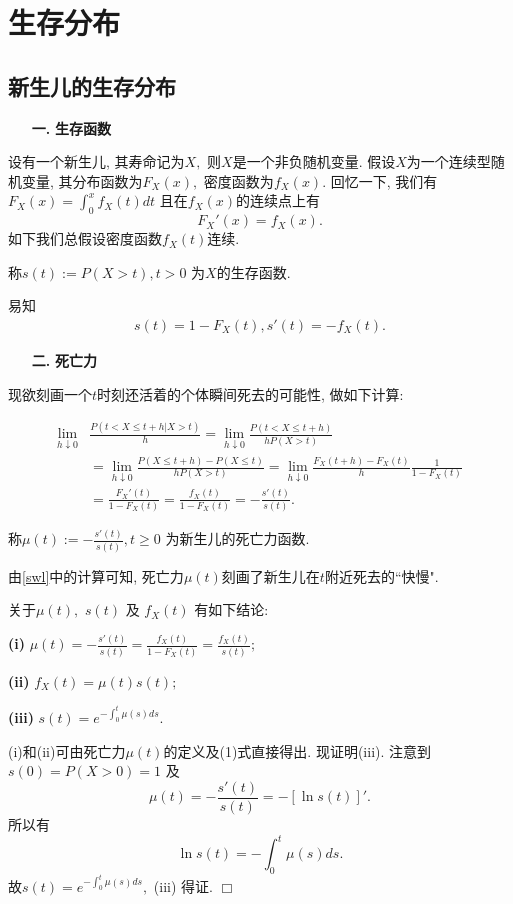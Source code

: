 \documentclass[a4paper,10pt]{ctexbook}
\newcommand{\hei}{\CJKfamily{hei}}      %
\def\qed{\hfill$\Box$\medskip}
\def\no{\nonumber}
\begin{document}
\mainmatter
\chapter{生存分布}
\section{新生儿的生存分布}
\begin{itemize}
    \item[{\bf\hei 一.}]{\bf\hei 生存函数}
\end{itemize}

设有一个新生儿, 其寿命记为$X,$ 则$X$是一个非负随机变量. 假设$X$为一个连续型随机变量, 其分布函数为$F_X(x),$ 密度函数为$f_X(x).$ 回忆一下, 我们有 $F_X(x)=\int_0^x f_X(t)dt$ 且在$f_X(x)$的连续点上有
$$F_X'(x)=f_X(x).$$
如下我们总假设密度函数$f_X(t)$连续.
\begin{definition}
    称$s(t):=P(X>t),t>0$ 为$X$的生存函数.
\end{definition}
易知
\begin{align}\label{sf}
    s(t)=1-F_X(t), s'(t)=-f_X(t).
\end{align}

\begin{itemize}
    \item[{\bf\hei  二.}]{\bf\hei 死亡力}
\end{itemize}

现欲刻画一个$t$时刻还活着的个体瞬间死去的可能性, 做如下计算:

\begin{align}\label{swl}
    \lim_{h\downarrow0} & \frac{P(t<X\le t+h|X>t)}{h}=\lim_{h\downarrow0} \frac{P(t<X\le t+h)}{hP(X>t)}\no                                            \\
                        & =\lim_{h\downarrow0}\frac{P(X\le t+h)-P(X\le t)}{hP(X>t)}=\lim_{h\downarrow0}\frac{F_X(t+h)-F_X(t)}{h}\frac{1}{1-F_X(t)}\no \\
                        & =\frac{F_X'(t)}{1-F_X(t)}=\frac{f_X(t)}{1-F_X(t)}=-\frac{s'(t)}{s(t)}.
\end{align}

\begin{definition}
    称$\mu(t):=-\frac{s'(t)}{s(t)},t\ge 0$ 为新生儿的死亡力函数.
\end{definition}
由\eqref{swl}中的计算可知, 死亡力$\mu(t)$刻画了新生儿在$t$附近死去的``快慢".

\begin{proposition} 关于$\mu(t),$ $s(t)$ 及 $f_X(t)$ 有如下结论:

    {\rm\bf(i)} $\mu(t)=-\frac{s'(t)}{s(t)}=\frac{f_X(t)}{1-F_X(t)}=\frac{f_X(t)}{s(t)};$

    {\rm\bf(ii)} $f_X(t)=\mu(t)s(t);$

    {\rm\bf(iii)} $s(t)=e^{-\int_0^t\mu(s)ds}.$

\end{proposition}
\proof (i)和(ii)可由死亡力$\mu(t)$的定义及(1)式直接得出. 现证明(iii). 注意到$s(0)=P(X>0)=1$ 及
$$\mu(t)=-\frac{s'(t)}{s(t)}=-[\ln s(t)]'.$$ 所以有
$$\ln s(t)=-\int_0^t\mu(s)ds.$$ 故$s(t)=e^{-\int_0^t\mu(s)ds},$ (iii) 得证. \qed
\end{document}
